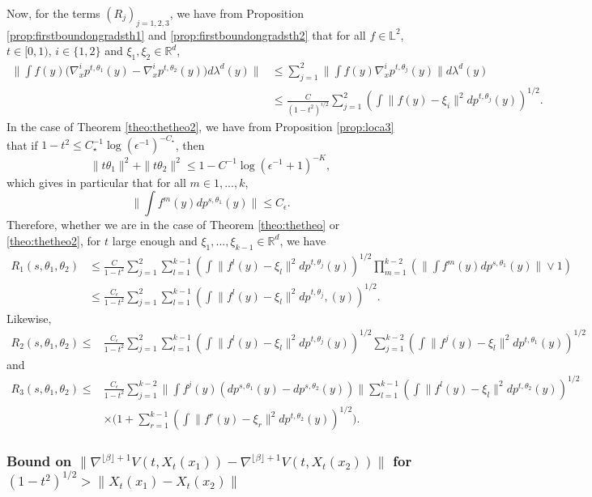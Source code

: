 \documentclass{article}
\begin{document}
Now, for the terms $(R_j)_{j=1,2,3}$,
we have from Proposition \ref{prop:firstboundongradsth1} and \ref{prop:firstboundongradsth2} that  for all $f\in \mathbb{L}^2$, $t\in[ 0,1)$, $i\in \{1,2\}$ and $\xi_1,\xi_2\in \mathbb{R}^d$,
\begin{align}\label{align:x1x2grand}
    \|\int f(y)\big(\nabla^i_x p^{t,\theta_1}(y)-\nabla^i_x p^{t,\theta_2}(y)\big)d\lambda^d(y)\|& \leq \sum_{j=1}^2 \|\int f(y)\nabla^i_x p^{t,\theta_j}(y)\|d\lambda^d(y)\nonumber\\
    & \leq \frac{C}{(1-t^2)^{i/2}}\sum_{j=1}^2\left(\int \|f(y)-\xi_i\|^2dp^{t,\theta_j}(y)\right)^{1/2}.
\end{align}
In the case of Theorem \ref{theo:thetheo2}, we have from Proposition \ref{prop:loca3} that if $1-t^2\leq C_\star^{-1}\log(\epsilon^{-1})^{-C_\star}$, then 
$$\|t\theta_1\|^2+\|t\theta_2\|^2  \leq 1-C^{-1}\log(\epsilon^{-1}+1)^{-K},$$
which gives in particular that for all $m\in 1,...,k$,
$$\|\int f^{m}(y) dp^{s,\theta_1}(y)\|\leq C_\epsilon.$$
Therefore, whether we are in the case of Theorem \ref{theo:thetheo} or \ref{theo:thetheo2}, for $t$ large enough and $\xi_1,...,\xi_{k-1}\in \mathbb{R}^d$, we have
\begin{align*}
    R_1(s,\theta_1,\theta_2) & \leq \frac{C}{1-t^2}\sum_{j=1}^2\sum_{l=1}^{k-1}\left(\int \|f^l(y)-\xi_l\|^2dp^{t,\theta_j}(y)\right)^{1/2} \prod_{m=1}^{k-2}\left(\|\int f^{m}(y) dp^{s,\theta_1}(y)\|\vee 1\right)\\
    & \leq \frac{C_\epsilon}{1-t^2}\sum_{j=1}^2\sum_{l=1}^{k-1}\left(\int \|f^l(y)-\xi_l\|^2dp^{t,\theta_j},(y)\right)^{1/2}.
\end{align*}
Likewise,
\begin{align*}
R_2(s,\theta_1,\theta_2)\leq & \frac{C_\epsilon}{1-t^2}\sum_{j=1}^2  \sum_{l=1}^{k-1}\left(\int \|f^l(y)-\xi_l\|^2dp^{t,\theta_j}(y)\right)^{1/2} \sum_{j=1}^{k-2}\left(\int \|f^j(y)-\xi_l\|^2dp^{t,\theta_1}(y)\right)^{1/2}
\end{align*}
and
\begin{align*}
    R_3(s,\theta_1,\theta_2)\leq & \frac{C_\epsilon}{1-t^2} \sum_{j=1}^{k-2} \|\int f^{j}(y)  (dp^{s,\theta_1}(y)-dp^{s,\theta_2}(y))\|\sum_{l=1}^{k-1}\left(\int \|f^l(y)-\xi_l\|^2dp^{t,\theta_2}(y)\right)^{1/2} \\
    & \times \Biggl(1+\sum_{r=1}^{k-1}\left(\int \|f^r(y)-\xi_r\|^2dp^{t,\theta_2}(y)\right)^{1/2}\Biggl).
\end{align*}

\subsubsection{Bound on $\|\nabla^{\lfloor \beta \rfloor+1} V(t,X_t(x_1))-\nabla^{\lfloor \beta \rfloor+1} V(t,X_t(x_2))\|$ for $(1-t^2)^{1/2}> \| X_t(x_1)- X_t(x_2)\|$ }\label{sec:boundnablavx1x22}
\end{document}
